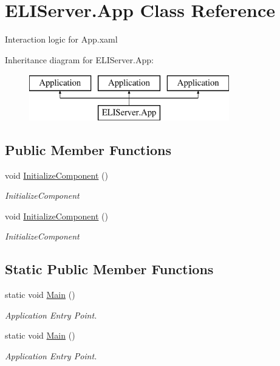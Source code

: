 \hypertarget{class_e_l_i_server_1_1_app}{}\section{E\+L\+I\+Server.\+App Class Reference}
\label{class_e_l_i_server_1_1_app}


Interaction logic for App.\+xaml  


Inheritance diagram for E\+L\+I\+Server.\+App\+:\begin{figure}[H]
\begin{center}
\leavevmode
\includegraphics[height=2.000000cm]{db/d4e/class_e_l_i_server_1_1_app}
\end{center}
\end{figure}
\subsection*{Public Member Functions}
\begin{DoxyCompactItemize}
\item 
void \hyperlink{class_e_l_i_server_1_1_app_adb5b419bd8d1d762b44cf23b66dae721}{Initialize\+Component} ()
\begin{DoxyCompactList}\small\item\em Initialize\+Component \end{DoxyCompactList}\item 
void \hyperlink{class_e_l_i_server_1_1_app_adb5b419bd8d1d762b44cf23b66dae721}{Initialize\+Component} ()
\begin{DoxyCompactList}\small\item\em Initialize\+Component \end{DoxyCompactList}\end{DoxyCompactItemize}
\subsection*{Static Public Member Functions}
\begin{DoxyCompactItemize}
\item 
static void \hyperlink{class_e_l_i_server_1_1_app_ab09015a9976089763eee4216f788d38e}{Main} ()
\begin{DoxyCompactList}\small\item\em Application Entry Point. \end{DoxyCompactList}\item 
static void \hyperlink{class_e_l_i_server_1_1_app_ab09015a9976089763eee4216f788d38e}{Main} ()
\begin{DoxyCompactList}\small\item\em Application Entry Point. \end{DoxyCompactList}\end{DoxyCompactItemize}


